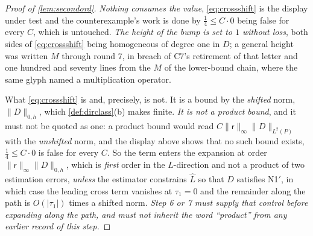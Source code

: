 \begin{proof}[Proof of \cref{lem:secondord}]
\emph{Nothing consumes the
value}, \eqref{eq:crossshift} is the display under test and the counterexample's work is done by
$\tfrac14\le C\cdot0$ being false for every $C$, which is untouched.
\emph{The height of the bump is set to $1$ without loss}, both sides of \eqref{eq:crossshift} being
homogeneous of degree one in $D$; a general height was written $M$ through round 7, in breach of C7's
retirement of that letter and one hundred and seventy lines from the $M$ of the lower-bound chain, where
the same glyph named a multiplication operator.

What \eqref{eq:crossshift} is and, precisely, is not. It is a bound by the \emph{shifted} norm,
$\|D\|_{0,h}$, which \cref{def:dirclass}(b) makes finite. \emph{It is not a product bound}, and it must
not be quoted as one: a product bound would read $C\|\mathsf r\|_\infty\|D\|_{L^{2}(P)}$ with the
\emph{unshifted} norm, and the display above shows that no such bound exists, $\tfrac14\le C\cdot0$ is
false for every $C$. So the term enters the expansion at order $\|\mathsf r\|_\infty\|D\|_{0,h}$, which
is \emph{first} order in the $L$-direction and not a product of two estimation errors, \emph{unless} the
estimator constrains $\hat L$ so that $D$ satisfies N1$'$, in which case the leading cross term vanishes
at $\tau_1=0$ and the remainder along the path is $O(|\tau_1|)$ times a shifted norm. \emph{Step 6 or 7
must supply that control before expanding along the path, and must not inherit the word ``product''
from any earlier record of this step.}


\end{proof}
